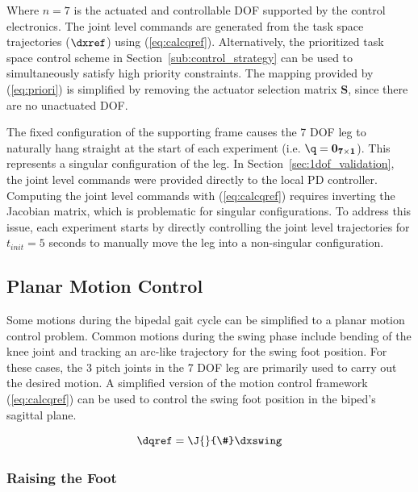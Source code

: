 Where $n = 7$ is the actuated and controllable DOF supported by the control electronics. The joint level commands are generated from the task space trajectories ($\dxref$) using (\ref{eq:calcqref}). Alternatively, the prioritized task space control scheme in Section~\ref{sub:control_strategy} can be used to simultaneously satisfy high priority constraints. The mapping provided by (\ref{eq:priori}) is simplified by removing the actuator selection matrix $\mathbf{S}$, since there are no unactuated DOF. 

The fixed configuration of the supporting frame causes the 7 DOF leg to naturally hang straight at the start of each experiment (i.e. $\q = \mathbf{0_{7 \times 1}}$). This represents a singular configuration of the leg. In Section~\ref{sec:1dof_validation}, the joint level commands were provided directly to the local PD controller. Computing the joint level commands with (\ref{eq:calcqref}) requires inverting the Jacobian matrix, which is problematic for singular configurations. To address this issue, each experiment starts by directly controlling the joint level trajectories for $t_{init} = 5$ seconds to manually move the leg into a non-singular configuration. 

\subsection{Planar Motion Control} %
\label{sub:planar_motion_control}
Some motions during the bipedal gait cycle can be simplified to a planar motion control problem. Common motions during the swing phase include bending of the knee joint and tracking an arc-like trajectory for the swing foot position. For these cases, the 3 pitch joints in the 7 DOF leg are primarily used to carry out the desired motion. A simplified version of the motion control framework (\ref{eq:calcqref}) can be used to control the swing foot position in the biped's sagittal plane.

\begin{equation}
	\dqref = \J{}{\#} \dxswing
\end{equation}

\subsubsection{Raising the Foot} %
\label{ssub:knee_bending_motion}

